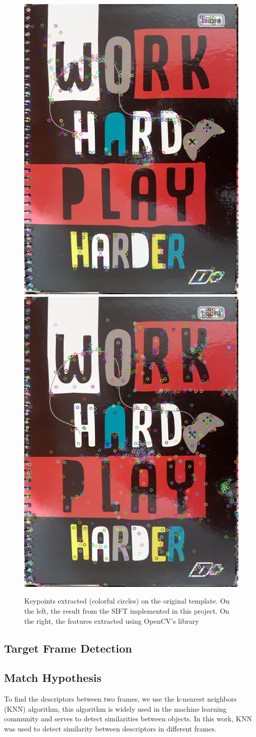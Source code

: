 \documentclass[]{IEEEtran}
\begin{document}
 \begin{figure}
     \centering
     \includegraphics[width=0.4\hsize]{img/o-kp-0.png}
     \includegraphics[width=0.4\hsize]{img/o-kp-1.png}
     \caption{Keypoints extracted (colorful circles) on the original template. On the left, the result from the SIFT implemented in this project. On the right, the features extracted using OpenCV's library}
     \label{fig:keypoints}
 \end{figure}


\subsection{Target Frame Detection}


\subsection{Match Hypothesis}

To find the descriptors between two frames, we use the k-nearest neighbors (KNN) algorithm, this algorithm is widely used in the machine learning community and serves to detect similarities between objects. In this work, KNN was used to detect similarity between descriptors in different frames.
\end{document}
